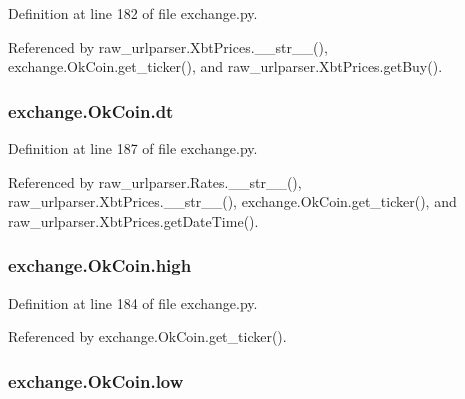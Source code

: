 Definition at line 182 of file exchange.\-py.



Referenced by raw\-\_\-urlparser.\-Xbt\-Prices.\-\_\-\-\_\-str\-\_\-\-\_\-(), exchange.\-Ok\-Coin.\-get\-\_\-ticker(), and raw\-\_\-urlparser.\-Xbt\-Prices.\-get\-Buy().

\hypertarget{classexchange_1_1_ok_coin_ade9d7cddcfa54f2b1ba5452854bfd48b}{
\subsubsection[{dt}]{\setlength{\rightskip}{0pt plus 5cm}exchange.\-Ok\-Coin.\-dt}}\label{classexchange_1_1_ok_coin_ade9d7cddcfa54f2b1ba5452854bfd48b}


Definition at line 187 of file exchange.\-py.



Referenced by raw\-\_\-urlparser.\-Rates.\-\_\-\-\_\-str\-\_\-\-\_\-(), raw\-\_\-urlparser.\-Xbt\-Prices.\-\_\-\-\_\-str\-\_\-\-\_\-(), exchange.\-Ok\-Coin.\-get\-\_\-ticker(), and raw\-\_\-urlparser.\-Xbt\-Prices.\-get\-Date\-Time().

\hypertarget{classexchange_1_1_ok_coin_af9d9dbcfc86404510e7f9a5704e8eecd}{
\subsubsection[{high}]{\setlength{\rightskip}{0pt plus 5cm}exchange.\-Ok\-Coin.\-high}}\label{classexchange_1_1_ok_coin_af9d9dbcfc86404510e7f9a5704e8eecd}


Definition at line 184 of file exchange.\-py.



Referenced by exchange.\-Ok\-Coin.\-get\-\_\-ticker().

\hypertarget{classexchange_1_1_ok_coin_a1afa53e0ad63830d0585288abea42094}{
\subsubsection[{low}]{\setlength{\rightskip}{0pt plus 5cm}exchange.\-Ok\-Coin.\-low}}\label{classexchange_1_1_ok_coin_a1afa53e0ad63830d0585288abea42094}


